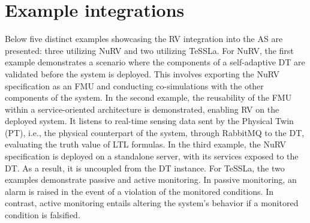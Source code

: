 \section{Example integrations}\label{sec:examples}

Below five distinct examples showcasing the RV integration into the AS are presented: three utilizing NuRV and two utilizing TeSSLa.
For NuRV, the first example demonstrates a scenario where the components of a self-adaptive DT are validated before the system is deployed.
This involves exporting the NuRV specification as an FMU and conducting co-simulations with the other components of the system.
In the second example, the reusability of the FMU within a service-oriented architecture is demonstrated, enabling RV on the deployed system.
It listens to real-time sensing data sent by the Physical Twin (PT), i.e., the physical counterpart of the system, through RabbitMQ to the DT, evaluating the truth value of LTL formulas.
In the third example, the NuRV specification is deployed on a standalone server, with its services exposed to the DT.
As a result, it is uncoupled from the DT instance.
For TeSSLa, the two examples demonstrate passive and active monitoring.
In passive monitoring, an alarm is raised in the event of a violation of the monitored conditions.
In contrast, active monitoring entails altering the system's behavior if a monitored condition is falsified.